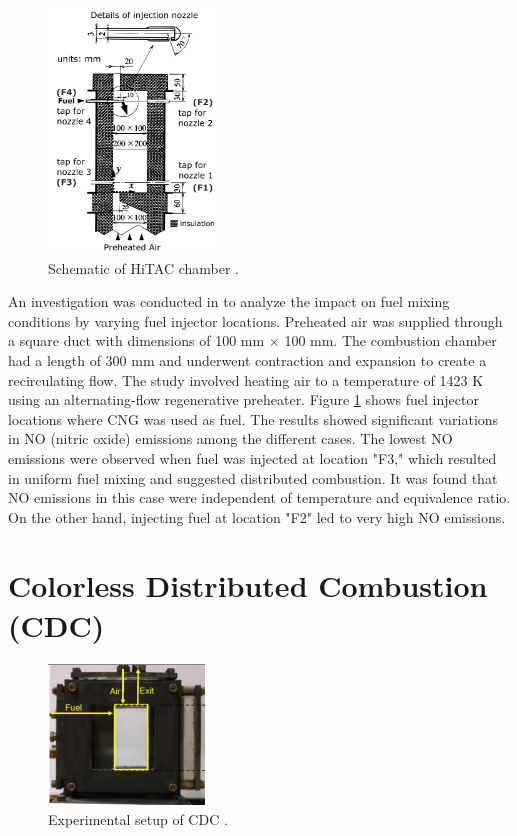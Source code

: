 \begin{figure}
    \centering
    \includegraphics[width=0.4\textwidth]{Chapter2/Images/HiTAC.png}
    \caption[Schematic of HiTAC chamber]{Schematic of HiTAC chamber \cite{CHOI1998}.}
    \label{fig:HiTAC}
\end{figure}

An investigation was conducted in \cite{CHOI1998} to analyze the impact on fuel mixing conditions by varying fuel injector locations. Preheated air was supplied through a square duct with dimensions of 100 mm $\times$ 100 mm. The combustion chamber had a length of 300 mm and underwent contraction and expansion to create a recirculating flow. The study involved heating air to a temperature of 1423 K using an alternating-flow regenerative preheater. Figure \ref{fig:HiTAC} shows fuel injector locations where CNG was used as fuel. The results showed significant variations in NO (nitric oxide) emissions among the different cases. The lowest NO emissions were observed when fuel was injected at location "F3," which resulted in uniform fuel mixing and suggested distributed combustion. It was found that NO emissions in this case were independent of temperature and equivalence ratio\cite{VAThesis2011}. On the other hand, injecting fuel at location "F2" led to very high NO emissions.

\section{Colorless Distributed Combustion (CDC)}
 \begin{figure}
     \centering
     \includegraphics[width=0.37\textwidth]{Chapter2/Images/CDC.png}
     \caption[Experimental setup of CDC]{Experimental setup of CDC \cite{ARGHODE2012822}.}
     \label{fig:CDC}
 \end{figure}
 
